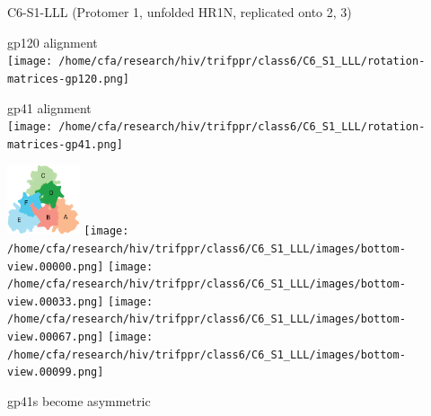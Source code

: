 \begin{frame}[fragile]{C6-S1-LLL {\tiny (Protomer 1, unfolded HR1N, replicated onto 2, 3)}}
    \begin{center}
        \begin{minipage}{0.47\textwidth}
            \begin{center}
                gp120 alignment\\
                \texttt{[image: /home/cfa/research/hiv/trifppr/class6/C6\_S1\_LLL/rotation-matrices-gp120.png]}
            \end{center}
        \end{minipage}
        \begin{minipage}{0.47\textwidth}
            \begin{center}
                gp41 alignment\\
                \texttt{[image: /home/cfa/research/hiv/trifppr/class6/C6\_S1\_LLL/rotation-matrices-gp41.png]}
            \end{center}
        \end{minipage}

        \includegraphics[width=0.16\textwidth]{trimer_paint_bottom_sodroski_smol.png}
        \texttt{[image: /home/cfa/research/hiv/trifppr/class6/C6\_S1\_LLL/images/bottom-view.00000.png]}
        \texttt{[image: /home/cfa/research/hiv/trifppr/class6/C6\_S1\_LLL/images/bottom-view.00033.png]}
        \texttt{[image: /home/cfa/research/hiv/trifppr/class6/C6\_S1\_LLL/images/bottom-view.00067.png]}
        \texttt{[image: /home/cfa/research/hiv/trifppr/class6/C6\_S1\_LLL/images/bottom-view.00099.png]}

        gp41s become asymmetric
    \end{center}
\end{frame}

